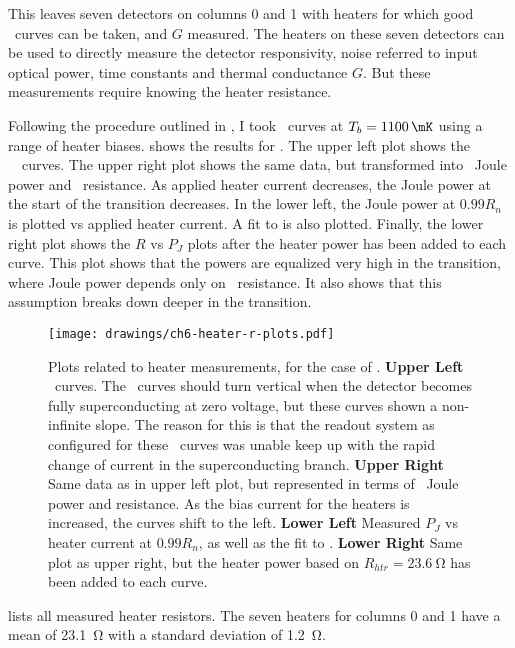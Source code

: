This leaves seven detectors on columns 0 and 1 with heaters for which good \IV\ curves can be taken, and $G$ measured.
The heaters on these seven detectors can be used to directly measure the detector responsivity, noise referred to input optical power, time constants and thermal conductance $G$.
But these measurements require knowing the heater resistance.

Following the procedure outlined in , I took \IV\ curves at $T_b = \SI{1100}{\mK}$ using a range of heater biases.
 shows the results for .
The upper left plot shows the \TES\ \IV\ curves.
The upper right plot shows the same data, but transformed into \TES\ Joule power and \TES\ resistance.
As applied heater current decreases, the Joule power at the start of the transition decreases.
In the lower left, the Joule power at $0.99R_{n}$ is plotted vs applied heater current.
A fit to  is also plotted.
Finally, the lower right plot shows the $R$ vs $P_J$ plots after the heater power has been added to each curve.
This plot shows that the powers are equalized very high in the transition, where Joule power depends only on \TES\ resistance.
It also shows that this assumption breaks down deeper in the transition.

\begin{figure*}
\texttt{[image: drawings/ch6-heater-r-plots.pdf]}
\caption[Plots related to heater measurements]{
Plots related to heater measurements, for the case of .
\textbf{Upper Left} \IV\ curves. The \IV\ curves should turn vertical when the detector becomes fully superconducting at zero voltage, but these curves shown a non-infinite slope. The reason for this is that the readout system as configured for these \IV\ curves was unable keep up with the rapid change of current in the superconducting branch.
\textbf{Upper Right} Same data as in upper left plot, but represented in terms of \TES\ Joule power and resistance. As the bias current for the heaters is increased, the curves shift to the left.
\textbf{Lower Left} Measured $P_{J}$ vs heater current at $0.99R_n$, as well as the fit to .
\textbf{Lower Right} Same plot as upper right, but the heater power based on $R_{htr} = \SI{23.6}{\ohm}$ has been added to each curve.
}
\label{fig:ch6-heater-r-plots}
\end{figure*}

 lists all measured heater resistors.
The seven heaters for columns 0 and 1 have a mean of \SI{23.1}{\ohm} with a standard deviation of \SI{1.2}{\ohm}.

